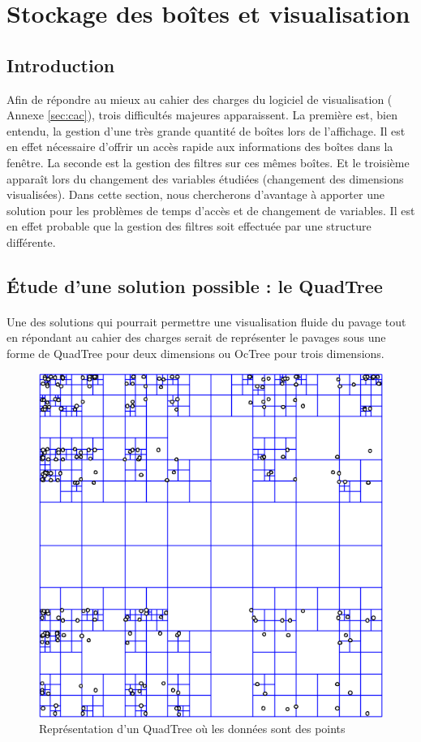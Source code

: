 \section{Stockage des boîtes et visualisation}\label{sec:vis}
\subsection{Introduction}
 Afin de répondre au mieux au cahier des charges du logiciel de visualisation (\cf{} Annexe \ref{sec:cac}), trois difficultés majeures apparaissent. La première est, bien entendu, la gestion d'une très grande quantité de boîtes lors de l'affichage. Il est en effet nécessaire d'offrir un accès rapide aux informations des boîtes dans la fenêtre. La seconde est la gestion des filtres sur ces mêmes boîtes. Et le troisième apparaît lors du changement des variables étudiées (changement des dimensions visualisées). Dans cette section, nous chercherons d'avantage à apporter une solution pour les problèmes de temps d'accès et de changement de variables. Il est en effet probable que la gestion des filtres soit effectuée par une structure différente.


\subsection{\'Etude d'une solution possible : le QuadTree}
\paragraph{}Une des solutions qui pourrait permettre une visualisation fluide du pavage tout en répondant au cahier des charges  serait de représenter le pavages sous une forme de QuadTree pour deux dimensions ou OcTree pour trois dimensions.
\begin{figure}[htbp]
\centering
\includegraphics[scale=0.50]{img/quadtree}
\caption{Représentation d'un QuadTree où les données sont des points}

\end{figure}

